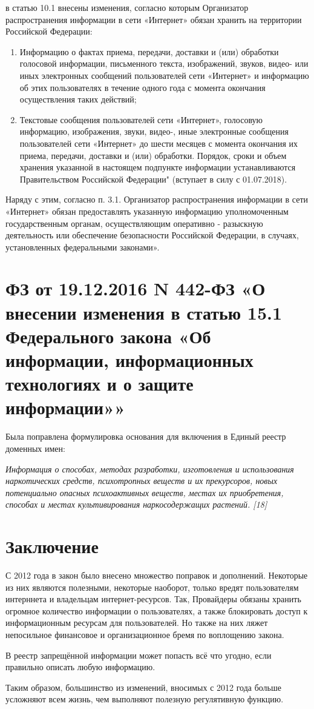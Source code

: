 \documentclass[14pt,a4paper,report]{article}
\begin{document}
в статью 10.1 внесены изменения, согласно которым Организатор распространения информации в сети «Интернет» обязан хранить на территории Российской Федерации:
\begin{enumerate}


	\item Информацию о фактах приема, передачи, доставки и (или) обработки голосовой информации, письменного текста, изображений, звуков, видео- или иных электронных сообщений пользователей сети «Интернет» и информацию об этих пользователях в течение одного года с момента окончания осуществления таких действий;

	\item Текстовые сообщения пользователей сети «Интернет», голосовую информацию, изображения, звуки, видео-, иные электронные сообщения пользователей сети «Интернет» до шести месяцев с момента окончания их приема, передачи, доставки и (или) обработки. Порядок, сроки и объем хранения указанной в настоящем подпункте информации устанавливаются Правительством Российской Федерации" (вступает в силу с 01.07.2018).
\end{enumerate}

Наряду с этим, согласно п. 3.1. Организатор распространения информации в сети «Интернет» обязан предоставлять указанную информацию уполномоченным государственным органам, осуществляющим оперативно - разыскную деятельность или обеспечение безопасности Российской Федерации, в случаях, установленных федеральными законами».


\section{ФЗ от 19.12.2016 N 442-ФЗ «О внесении изменения в статью 15.1 Федерального закона «Об информации, информационных технологиях и о защите информации»»}

Была поправлена формулировка основания для включения в Единый реестр доменных имен:

\begin{displayquote}
	\emph{Информация о способах, методах разработки, изготовления и использования наркотических средств, психотропных веществ и их прекурсоров, новых потенциально опасных психоактивных веществ, местах их приобретения, способах и местах культивирования наркосодержащих растений. [18]}
\end{displayquote}


\section{Заключение}
С 2012 года в закон было внесено множество поправок и дополнений. Некоторые из них являются полезными, некоторые наоборот, только вредят пользователям интерннета и владельцам интернет-ресурсов.
Так, Провайдеры обязаны хранить огромное количество информации о пользователях, а также блокировать доступ к информационным ресурсам для пользователей. Но также на них ляжет непосильное финансовое и организационное бремя по воплощению закона.

В реестр запрещённой информации может попасть всё что угодно, если правильно описать любую информацию.

Таким образом, большинство из изменений, вносимых с 2012 года больше усложняют всем жизнь, чем выполняют полезную регулятивную функцию.
\end{document}
